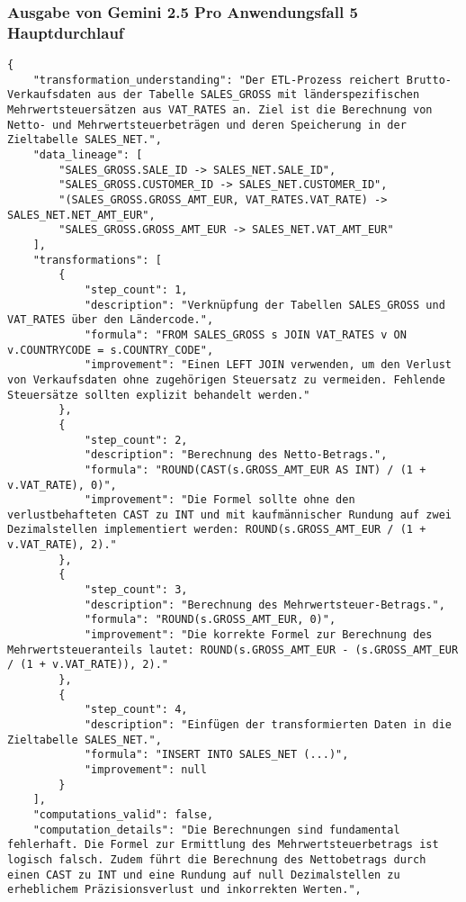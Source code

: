 \subsubsection{Ausgabe von Gemini 2.5 Pro Anwendungsfall 5 Hauptdurchlauf}\label{anhang:subsubsec:gemini_case5_prompt1}
\begin{lstlisting}[caption={Ausgabe: Gemini 2.5 Pro Anwendungsfall 5 Hauptdurchlauf},label={gemini_case5_prompt1}]
{
    "transformation_understanding": "Der ETL-Prozess reichert Brutto-Verkaufsdaten aus der Tabelle SALES_GROSS mit länderspezifischen Mehrwertsteuersätzen aus VAT_RATES an. Ziel ist die Berechnung von Netto- und Mehrwertsteuerbeträgen und deren Speicherung in der Zieltabelle SALES_NET.",
    "data_lineage": [
        "SALES_GROSS.SALE_ID -> SALES_NET.SALE_ID",
        "SALES_GROSS.CUSTOMER_ID -> SALES_NET.CUSTOMER_ID",
        "(SALES_GROSS.GROSS_AMT_EUR, VAT_RATES.VAT_RATE) -> SALES_NET.NET_AMT_EUR",
        "SALES_GROSS.GROSS_AMT_EUR -> SALES_NET.VAT_AMT_EUR"
    ],
    "transformations": [
        {
            "step_count": 1,
            "description": "Verknüpfung der Tabellen SALES_GROSS und VAT_RATES über den Ländercode.",
            "formula": "FROM SALES_GROSS s JOIN VAT_RATES v ON v.COUNTRYCODE = s.COUNTRY_CODE",
            "improvement": "Einen LEFT JOIN verwenden, um den Verlust von Verkaufsdaten ohne zugehörigen Steuersatz zu vermeiden. Fehlende Steuersätze sollten explizit behandelt werden."
        },
        {
            "step_count": 2,
            "description": "Berechnung des Netto-Betrags.",
            "formula": "ROUND(CAST(s.GROSS_AMT_EUR AS INT) / (1 + v.VAT_RATE), 0)",
            "improvement": "Die Formel sollte ohne den verlustbehafteten CAST zu INT und mit kaufmännischer Rundung auf zwei Dezimalstellen implementiert werden: ROUND(s.GROSS_AMT_EUR / (1 + v.VAT_RATE), 2)."
        },
        {
            "step_count": 3,
            "description": "Berechnung des Mehrwertsteuer-Betrags.",
            "formula": "ROUND(s.GROSS_AMT_EUR, 0)",
            "improvement": "Die korrekte Formel zur Berechnung des Mehrwertsteueranteils lautet: ROUND(s.GROSS_AMT_EUR - (s.GROSS_AMT_EUR / (1 + v.VAT_RATE)), 2)."
        },
        {
            "step_count": 4,
            "description": "Einfügen der transformierten Daten in die Zieltabelle SALES_NET.",
            "formula": "INSERT INTO SALES_NET (...)",
            "improvement": null
        }
    ],
    "computations_valid": false,
    "computation_details": "Die Berechnungen sind fundamental fehlerhaft. Die Formel zur Ermittlung des Mehrwertsteuerbetrags ist logisch falsch. Zudem führt die Berechnung des Nettobetrags durch einen CAST zu INT und eine Rundung auf null Dezimalstellen zu erheblichem Präzisionsverlust und inkorrekten Werten.",

\end{lstlisting}
